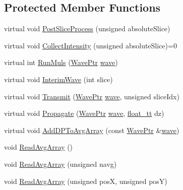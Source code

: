 \subsection*{Protected Member Functions}
\begin{DoxyCompactItemize}
\item 
virtual void \hyperlink{class_q_s_t_e_m_1_1_c_experiment_base_add43249257db61a77309e3455dfc6496}{Post\-Slice\-Process} (unsigned absolute\-Slice)
\item 
virtual void \hyperlink{class_q_s_t_e_m_1_1_c_experiment_base_a7e83ca983833f93da2d03bf9eb837f0b}{Collect\-Intensity} (unsigned absolute\-Slice)=0
\item 
virtual int \hyperlink{class_q_s_t_e_m_1_1_c_experiment_base_a912f78e3a9eb1cbbd578c22851da82b6}{Run\-Muls} (\hyperlink{namespace_q_s_t_e_m_ab42c5fe058973736465964e84b504b74}{Wave\-Ptr} \hyperlink{sim_image_from_wave_8m_acb3ac767ec1048cf315487da2b577ca4}{wave})
\item 
virtual void \hyperlink{class_q_s_t_e_m_1_1_c_experiment_base_a25b80cb61834ac9a9c3bc9b39322861d}{Interim\-Wave} (int slice)
\item 
virtual void \hyperlink{class_q_s_t_e_m_1_1_c_experiment_base_a75bb61d85bdf7067a6c6ed8502a3194a}{Transmit} (\hyperlink{namespace_q_s_t_e_m_ab42c5fe058973736465964e84b504b74}{Wave\-Ptr} \hyperlink{sim_image_from_wave_8m_acb3ac767ec1048cf315487da2b577ca4}{wave}, unsigned slice\-Idx)
\item 
virtual void \hyperlink{class_q_s_t_e_m_1_1_c_experiment_base_adc1c4f1d70d07373c6c682310d7ffe89}{Propagate} (\hyperlink{namespace_q_s_t_e_m_ab42c5fe058973736465964e84b504b74}{Wave\-Ptr} \hyperlink{sim_image_from_wave_8m_acb3ac767ec1048cf315487da2b577ca4}{wave}, \hyperlink{namespace_q_s_t_e_m_a915d7caa497280d9f927c4ce8d330e47}{float\-\_\-tt} dz)
\item 
virtual void \hyperlink{class_q_s_t_e_m_1_1_c_experiment_base_a87b15165341f40c4a9fb3aa8c1adc6f4}{Add\-D\-P\-To\-Avg\-Array} (const \hyperlink{namespace_q_s_t_e_m_ab42c5fe058973736465964e84b504b74}{Wave\-Ptr} \&\hyperlink{sim_image_from_wave_8m_acb3ac767ec1048cf315487da2b577ca4}{wave})
\item 
void \hyperlink{class_q_s_t_e_m_1_1_c_experiment_base_a675db6ccbb83c03e8e06d5a2ab7d6112}{Read\-Avg\-Array} ()
\item 
void \hyperlink{class_q_s_t_e_m_1_1_c_experiment_base_a9d1e2da30f60110da9998d361dbfce1e}{Read\-Avg\-Array} (unsigned navg)
\item 
void \hyperlink{class_q_s_t_e_m_1_1_c_experiment_base_a68cfe7abae5f66a62afdcfd177b8d3b6}{Read\-Avg\-Array} (unsigned pos\-X, unsigned pos\-Y)

\end{DoxyCompactItemize}
